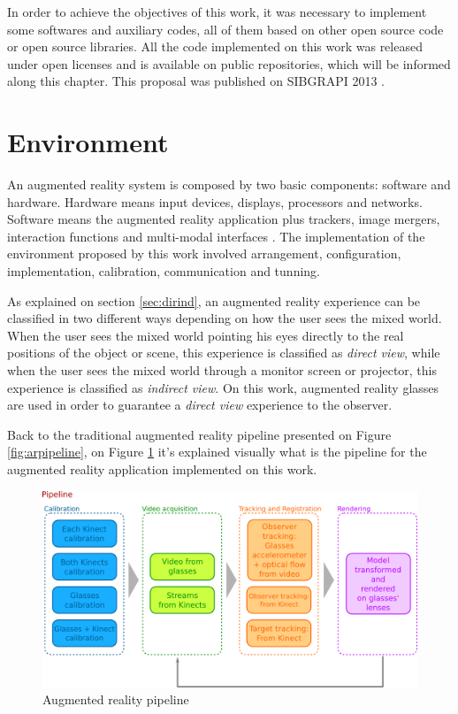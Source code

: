 \documentclass[msc, a4paper, classic, en]{ufbathesis}
\begin{document}

In order to achieve the objectives of this work, it was necessary to implement some softwares and auxiliary codes, all of them based on other open source code or open source libraries. All the code implemented on this work was released under open licenses and is available on public repositories, which will be informed along this chapter. This proposal was published on SIBGRAPI 2013 \cite{sibgrapi}.

\section{Environment}
\label{sec:env}

An augmented reality system is composed by two basic components: software and hardware. Hardware means input devices, displays, processors and networks. Software means the augmented reality application plus trackers, image mergers, interaction functions and multi-modal interfaces \cite{tori2006fundamentos}. The implementation of the environment proposed by this work involved arrangement, configuration, implementation, calibration, communication and tunning.

As explained on section \ref{sec:dirind}, an augmented reality experience can be classified in two different ways depending on how the user sees the mixed world. When the user sees the mixed world pointing his eyes directly to the real positions of the object or scene, this experience is classified as \textit{direct view}, while when the user sees the mixed world through a monitor screen or projector, this experience is classified as \textit{indirect view}. On this work, augmented reality glasses are used in order to guarantee a \textit{direct view} experience to the observer.

Back to the traditional augmented reality pipeline presented on Figure \ref{fig:arpipeline}, on Figure \ref{fig:pipeline} it's explained visually what is the pipeline for the augmented reality application implemented on this work.

\begin{figure}
\centering
\includegraphics[width=1\textwidth]{images/pipeline.png}
\caption{Augmented reality pipeline}
\label{fig:pipeline}
\end{figure}
\end{document}
